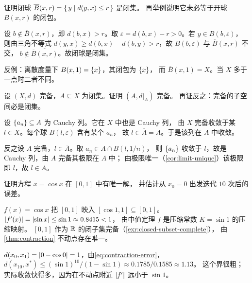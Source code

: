 \begin{exercise}[例行]
  \label{exr:closed-ball}
  证明闭球 \(\overline{B}(x,r) = \left\{\,y \;\middle|\; d(y,x) \le r\,\right\}\) 是闭集。
  再举例说明它未必等于开球 \(B(x,r)\) 的闭包。
  \begin{solution}
    设 \(b \notin \overline{B}(x,r)\)，即 \(d(b,x) > r\)。取
    \(\varepsilon = d(b,x)-r > 0\)。若 \(y \in B(b,\varepsilon)\)，则由三角不等式
    \(d(y,x) \ge d(b,x)-d(b,y) > r\)，故 \(B(b,\varepsilon)\) 与 \(\overline{B}(x,r)\) 不交，
    \(b \notin \overline{\overline{B}(x,r)}\)。故闭球是闭集。

    反例：离散度量下 \(B(x,1) = \left\{x\right\}\)，其闭包为 \(\left\{x\right\}\)，
    而 \(\overline{B}(x,1) = X\)。当 \(X\) 多于一点时二者不同。
  \end{solution}
\end{exercise}

\begin{exercise}[例行]
  \label{exr:closed-subset-complete}
  设 \((X,d)\) 完备，\(A \subseteq X\) 为闭集。证明 \((A, d|_{A})\) 完备。
  再证反之：完备的子空间必是闭集。
  \begin{solution}
    设 \(\{a_{n}\} \subseteq A\) 为 Cauchy 列。它在 \(X\) 中也是 Cauchy 列，
    由 \(X\) 完备收敛于某 \(l \in X\)。每个球 \(B(l,\varepsilon)\) 含有某个 \(a_{n}\)，
    故 \(l \in \overline{A} = A\)。于是该列在 \(A\) 中收敛。

    反之设 \(A\) 完备，\(l \in \overline{A}\)。取 \(a_{n} \in A \cap B(l,1/n)\)，
    则 \(\{a_{n}\}\) 收敛于 \(l\)，故是 Cauchy 列，由 \(A\) 完备其极限在 \(A\) 中；
    由极限唯一（\cref{cor:limit-unique}）该极限即 \(l\)，故 \(l \in A\)。
  \end{solution}
\end{exercise}

\begin{exercise}[例行]
  \label{exr:cos-fixed-point}
  证明方程 \(x = \cos x\) 在 \([0,1]\) 中有唯一解，
  并估计从 \(x_{0}=0\) 出发迭代 \(10\) 次后的误差。
  \begin{solution}
    \(f(x)=\cos x\) 把 \([0,1]\) 映入 \([\cos 1, 1] \subseteq [0,1]\)。
    \(\lvert f'(x)\rvert = \lvert\sin x\rvert \le \sin 1 \approx 0.8415 < 1\)，
    由中值定理 \(f\) 是压缩常数 \(K = \sin 1\) 的压缩映射。
    \([0,1]\) 作为 \(\mathbb{R}\) 的闭子集完备（\cref{exr:closed-subset-complete}），
    由\cref{thm:contraction} 不动点存在唯一。

    \(d(x_{0},x_{1}) = \lvert0 - \cos 0\rvert = 1\)，由\cref{eq:contraction-error}，
    \(d(x_{10},x^{*}) \le (\sin 1)^{10}/(1-\sin 1) \approx 0.1785/0.1585 \approx 1.13\)。
    这个界很粗；实际收敛快得多，因为在不动点附近 \(\lvert f'\rvert\) 远小于 \(\sin 1\)。
  \end{solution}
\end{exercise}

